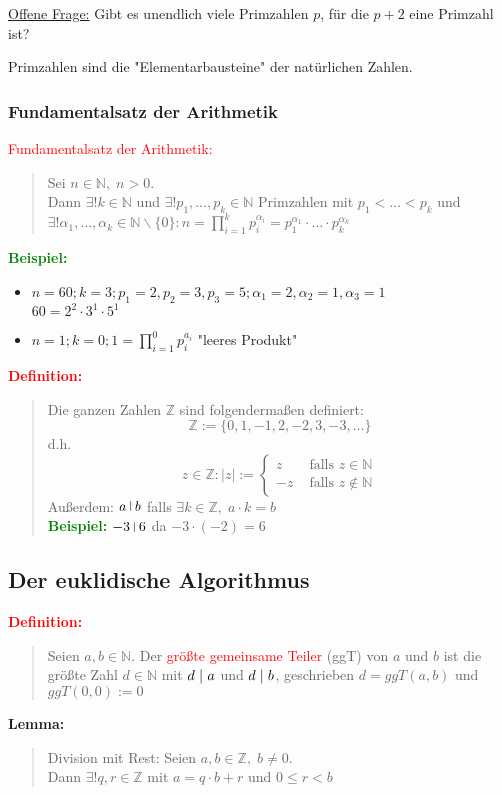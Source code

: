 \documentclass{article}
\newcommand{\smsp}{\phantom{\hspace{3px}}}
\newcommand{\red}[1]{\textcolor{red}{#1}}
\newcommand{\green}[1]{\textcolor{green}{#1}}
\newcommand{\dgr}[1]{\textcolor{dgr}{#1}}
\newcommand{\ex}{\green{\textbf{Beispiel: }}}
\newcommand{\de}[1]{\red{\textbf{Definition: }}\begin{quote}#1\end{quote}}
\newcommand{\lem}[1]{\dgr{\textbf{Lemma: }}\begin{quote}#1\end{quote}}
\newcommand{\N}{\mathbb{N}}
\newcommand{\Z}{\mathbb{Z}}
\newcommand{\vst}{\smsp \vline \smsp}
\renewcommand{\st}{\smsp | \smsp}
\begin{document}
\underline{Offene Frage:} Gibt es unendlich viele Primzahlen $p$, für die $p + 2$ eine Primzahl ist?

Primzahlen sind die "Elementarbausteine" der natürlichen Zahlen.

\subsubsection{Fundamentalsatz der Arithmetik}

\red{Fundamentalsatz der Arithmetik:}
\begin{quote}
    Sei $n \in \N, \; n > 0$.\\
    Dann $\exists! k \in \N$ und $\exists! p_1,\dots,p_k \in \N$ Primzahlen mit $p_1 < \dots < p_k$ und $\exists! \alpha_1, \dots, \alpha_k \in \N \backslash \{0\}: n = \prod_{i = 1}^{k} p_i^{\alpha_i} = p_1^{\alpha_1} \cdot \dots \cdot p_k^{\alpha_k}$
\end{quote}

\ex \begin{itemize}
    \item $n = 60; k = 3; p_1 = 2, p_2 = 3, p_3 = 5; \alpha_1 = 2, \alpha_2 = 1, \alpha_3 = 1$\\
    $60 = 2^2 \cdot 3^1 \cdot 5^1$
    \item $n = 1; k = 0; 1 = \prod_{i = 1}^{0} p_i^{a_i}$ "leeres Produkt"
\end{itemize}

\newpage
\de{
    Die ganzen Zahlen $\Z$ sind folgendermaßen definiert:
    \[
        \Z := \{0, 1, -1, 2, -2, 3, -3, \dots\}
    \]
    d.h.
    \[
        z \in \Z: |z| := \begin{cases}
            z & \text{ falls } z \in \N\\
            -z & \text{ falls } z \notin \N
        \end{cases}
    \]
    Außerdem: $a \vst b$ falls $\exists k \in \Z, \; a \cdot k = b$\\
    \ex $-3 \vst 6$ da $-3 \cdot (-2) = 6$
}

\subsection{Der euklidische Algorithmus}

\de{
    Seien $a,b \in \N$. Der \red{größte gemeinsame Teiler} (ggT) von $a$ und $b$ ist die größte Zahl $d \in \N$ mit $d \st a$ und $d \st b$, geschrieben $d = ggT(a,b)$ und $ggT(0,0) := 0$
}

\lem{
    Division mit Rest: Seien $a, b \in \Z, \; b \neq 0$.\\
    Dann $\exists! q,r \in \Z$ mit $a = q \cdot b + r$ und $0 \leq r < b$
}
\end{document}
